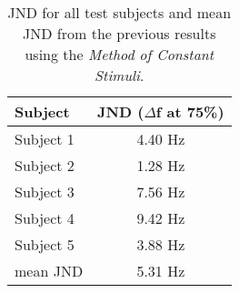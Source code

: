 %
\begin{table}[H]
\centering
\begin{tabular}{l|c}
Subject     & JND ($\Delta$f at 75\%) \\\hline
Subject 1   & 4.40 Hz                 \\\hline
Subject 2   & 1.28 Hz                 \\\hline
Subject 3   & 7.56 Hz                 \\\hline
Subject 4   & 9.42 Hz                 \\\hline
Subject 5   & 3.88 Hz                 \\\hline
mean JND & 5.31 Hz       
\end{tabular}
\caption{JND for all test subjects and mean JND from the previous results using the \textit{Method of Constant Stimuli}.}
\label{tab:JND_constant}         
\end{table}
\noindent